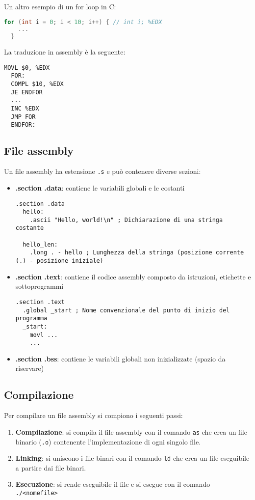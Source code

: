 \documentclass[a4paper]{article}
\theoremstyle{break}
\theoremstyle{break}
\theoremstyle{break}
\theoremstyle{break}
\begin{document}
\noindent Un altro esempio di un for loop in C:
\begin{lstlisting}[language=C]
  for (int i = 0; i < 10; i++) { // int i; %EDX
    ...
  }
\end{lstlisting}

\noindent La traduzione in assembly è la seguente:
\begin{lstlisting}[language={[x86masm]Assembler}]
  MOVL $0, %EDX
  FOR:
  COMPL $10, %EDX
  JE ENDFOR
  ...
  INC %EDX
  JMP FOR
  ENDFOR:
\end{lstlisting}

\subsection{File assembly}
Un file assembly ha estensione \texttt{.s} e può contenere diverse sezioni:
\begin{itemize}
	\item \textbf{.section .data}: contiene le variabili globali e le costanti
	      \begin{lstlisting}[language={[x86masm]Assembler}]
  .section .data
  hello:
    .ascii "Hello, world!\n" ; Dichiarazione di una stringa costante

  hello_len:
    .long . - hello ; Lunghezza della stringa (posizione corrente (.) - posizione iniziale)
  \end{lstlisting}

	\item \textbf{.section .text}: contiene il codice assembly composto da istruzioni, etichette
	      e sottoprogrammi
	      \begin{lstlisting}[language={[x86masm]Assembler}]
  .section .text
  .global _start ; Nome convenzionale del punto di inizio del programma
  _start:
    movl ...
    ...
  \end{lstlisting}

	\item \textbf{.section .bss}: contiene le variabili globali non inizializzate (spazio da riservare)
\end{itemize}

\subsection{Compilazione}
Per compilare un file assembly si compiono i seguenti passi:
\begin{enumerate}
	\item \textbf{Compilazione}: si compila il file assembly con il comando \texttt{as} che
	      crea un file binario (\texttt{.o}) contenente
	      l'implementazione di ogni singolo file.
	\item \textbf{Linking}: si uniscono i file binari con il comando \texttt{ld} che crea un file eseguibile
	      a partire dai file binari.
	\item \textbf{Esecuzione}: si rende eseguibile il file e si esegue con il comando \\\texttt{./<nomefile>}
\end{enumerate}
\end{document}
